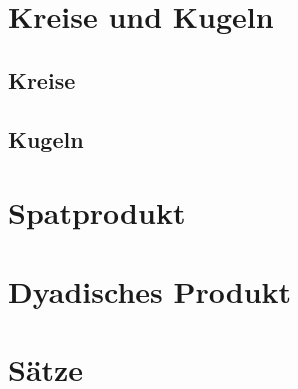 \section{Kreise und Kugeln}
    \subsection{Kreise}
    \subsection{Kugeln}
\section{Spatprodukt}
\section{Dyadisches Produkt}
\section{Sätze}

